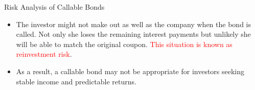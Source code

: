 \documentclass{beamer}
\begin{document}
\begin{frame}{Risk Analysis of Callable Bonds}
	\begin{itemize}
		\item<1-> The investor might not make out as well as the company when the bond is called. Not only she loses the remaining interest payments but unlikely she will be able to match the original coupon.
		\textcolor{red}{This situation is known as reinvestment risk}. 

		\item<2-> As a result, a callable bond may not be appropriate for investors seeking stable income and predictable returns.
	\end{itemize}
\end{frame}
		
\end{document}
